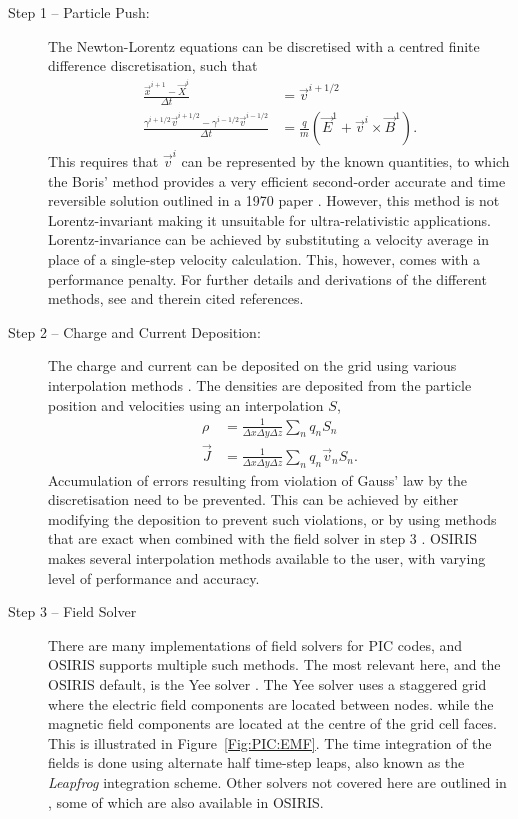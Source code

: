 \begin{description}
    \item[Step 1 -- Particle Push:] The Newton-Lorentz equations can be discretised with a centred finite difference discretisation, such that
    \begin{align}
        \frac{\vec{x}^{i+1} - \vec{X}^i}{\Delta t} &= \vec{v}^{i+1/2} \\
        \frac{\gamma^{i+1/2}\vec{v}^{i+1/2} - \gamma^{i-1/2}\vec{v}^{i-1/2}}{\Delta t} &=
            \frac{q}{m}\left(\vec{E}^1 + \vec{v}^i \times \vec{B}^1\right).
    \end{align}
    This requires that $\vec{v}^i$ can be represented by the known quantities, to which the Boris' method provides a very efficient second-order accurate and time reversible solution outlined in a 1970 paper \cite{boris:1970}.
    However, this method is not Lorentz-invariant \cite{vay:2008} making it unsuitable for ultra-relativistic applications.
    Lorentz-invariance can be achieved by substituting a velocity average in place of a single-step velocity calculation.
    This, however, comes with a performance penalty.
    For further details and derivations of the different methods, see \cite{vay:2016} and therein cited references.
    
    \item[Step 2 -- Charge and Current Deposition:] The charge and current can be deposited on the grid using various interpolation methods \cite{abe:1986}.
    The densities are deposited from the particle position and velocities using an interpolation $S$,
    \begin{align}
        \rho    &= \frac{1}{\Delta x \Delta y \Delta z} \sum_n q_n S_n \\
        \vec{J} &= \frac{1}{\Delta x \Delta y \Delta z} \sum_n q_n \vec{v}_n S_n.
    \end{align}
    Accumulation of errors resulting from violation of Gauss' law by the discretisation need to be prevented.
    This can be achieved by either modifying the deposition to prevent such violations, or by using methods that are exact when combined with the field solver in step 3 \cite{vay:2016}.
    OSIRIS makes several interpolation methods available to the user, with varying level of performance and accuracy.
    
    \item[Step 3 -- Field Solver] There are many implementations of field solvers for PIC codes, and OSIRIS supports multiple such methods.
    The most relevant here, and the OSIRIS default, is the Yee solver \cite{yee:1966}.
    The Yee solver uses a staggered grid where the electric field components are located between nodes. while the magnetic field components are located at the centre of the grid cell faces.
    This is illustrated in Figure~\ref{Fig:PIC:EMF}.
    The time integration of the fields is done using alternate half time-step leaps, also known as the \textit{Leapfrog} integration scheme.
    Other solvers not covered here are outlined in \cite{vay:2016}, some of which are also available in OSIRIS.
    

\end{description}
